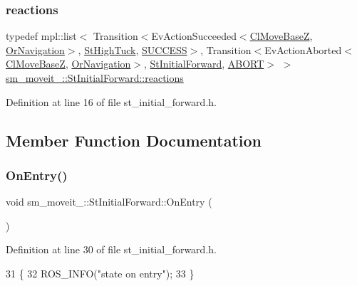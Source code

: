 \subsubsection{\texorpdfstring{reactions}{reactions}}
{\footnotesize\ttfamily typedef mpl\+::list$<$ Transition$<$Ev\+Action\+Succeeded$<$\hyperlink{classcl__move__base__z_1_1ClMoveBaseZ}{Cl\+Move\+BaseZ}, \hyperlink{classsm__moveit__3_1_1OrNavigation}{Or\+Navigation}$>$, \hyperlink{structsm__moveit__3_1_1StHighTuck}{St\+High\+Tuck}, \hyperlink{classSUCCESS}{S\+U\+C\+C\+E\+SS}$>$, Transition$<$Ev\+Action\+Aborted$<$\hyperlink{classcl__move__base__z_1_1ClMoveBaseZ}{Cl\+Move\+BaseZ}, \hyperlink{classsm__moveit__3_1_1OrNavigation}{Or\+Navigation}$>$, \hyperlink{structsm__moveit__3_1_1StInitialForward}{St\+Initial\+Forward}, \hyperlink{classABORT}{A\+B\+O\+RT}$>$ $>$ \hyperlink{structsm__moveit__3_1_1StInitialForward_a30c579fb07bd03ec88e8cf2eb5fba3ae}{sm\+\_\+moveit\+\_\+::\+St\+Initial\+Forward\+::reactions}}



Definition at line 16 of file st\+\_\+initial\+\_\+forward.\+h.



\subsection{Member Function Documentation}
\mbox{\label{structsm__moveit__3_1_1StInitialForward_a494ff696db5277bbf79467e4e03f9ccf}} 
\subsubsection{\texorpdfstring{On\+Entry()}{OnEntry()}}
{\footnotesize\ttfamily void sm\+\_\+moveit\+\_\+::\+St\+Initial\+Forward\+::\+On\+Entry (\begin{DoxyParamCaption}{ }\end{DoxyParamCaption})\hspace{0.3cm}{\ttfamily [inline]}}



Definition at line 30 of file st\+\_\+initial\+\_\+forward.\+h.


\begin{DoxyCode}
31     \{
32         ROS\_INFO(\textcolor{stringliteral}{"state on entry"});
33     \}
\end{DoxyCode}
\mbox{\label{structsm__moveit__3_1_1StInitialForward_af5c6190f58e14eb34d9abca713aad9eb}} 

